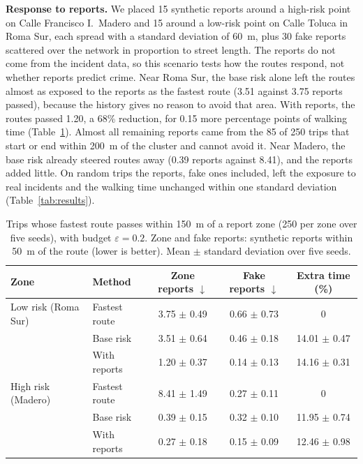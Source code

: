 \documentclass{article}
\begin{document}
\textbf{Response to reports.} We placed 15 synthetic reports around a high-risk point on Calle
Francisco I.\ Madero and 15 around a low-risk point on Calle Toluca in Roma Sur, each spread with
a standard deviation of 60~m, plus 30 fake reports scattered over the network in proportion to
street length. The reports do not come from the incident data, so this scenario tests how the
routes respond, not whether reports predict crime. Near Roma Sur, the base risk alone left the
routes almost as exposed to the reports as the fastest route (3.51 against 3.75 reports passed),
because the history gives no reason to avoid that area. With reports, the routes passed 1.20, a
68\% reduction, for 0.15 more percentage points of walking time (Table~\ref{tab:reports}). Almost
all remaining reports came from the 85 of 250 trips that start or end within 200~m of the cluster
and cannot avoid it. Near Madero, the base risk already steered routes away (0.39 reports against
8.41), and the reports added little. On random trips the reports, fake ones included, left the
exposure to real incidents and the walking time unchanged within one standard deviation
(Table~\ref{tab:results}).

\begin{table}[t]
  \caption{Trips whose fastest route passes within 150~m of a report zone (250 per zone over five
  seeds), with budget $\varepsilon=0.2$. Zone and fake reports: synthetic reports within 50~m of
  the route (lower is better). Mean $\pm$ standard deviation over five seeds.}
  \label{tab:reports}
  \centering
  \small
  \begin{tabular}{llccc}
    \toprule
    Zone & Method & Zone reports $\downarrow$ & Fake reports $\downarrow$ & Extra time (\%) \\
    \midrule
    Low risk (Roma Sur) & Fastest route & 3.75 $\pm$ 0.49 & 0.66 $\pm$ 0.73 & 0 \\
     & Base risk & 3.51 $\pm$ 0.64 & 0.46 $\pm$ 0.18 & 14.01 $\pm$ 0.47 \\
     & With reports & 1.20 $\pm$ 0.37 & 0.14 $\pm$ 0.13 & 14.16 $\pm$ 0.31 \\
    \midrule
    High risk (Madero) & Fastest route & 8.41 $\pm$ 1.49 & 0.27 $\pm$ 0.11 & 0 \\
     & Base risk & 0.39 $\pm$ 0.15 & 0.32 $\pm$ 0.10 & 11.95 $\pm$ 0.74 \\
     & With reports & 0.27 $\pm$ 0.18 & 0.15 $\pm$ 0.09 & 12.46 $\pm$ 0.98 \\
    \bottomrule
  \end{tabular}
\end{table}
\end{document}
